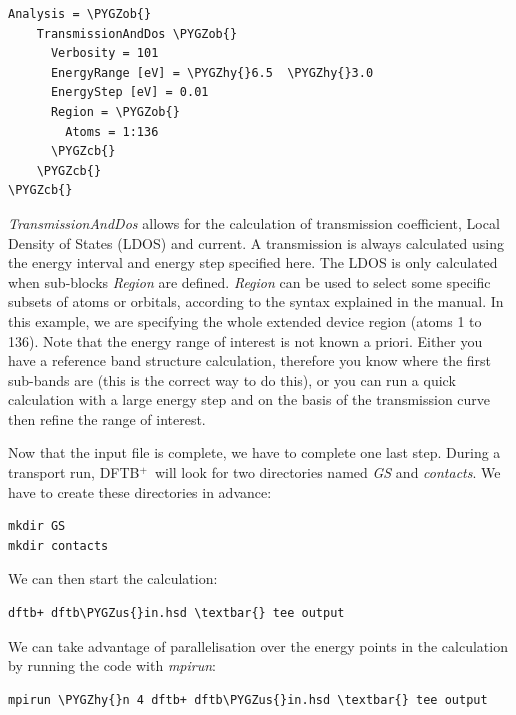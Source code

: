 \documentclass[a4paper,11pt,english]{sphinxmanual}
\newcommand{\dftbp}{\textsf{DFTB$^{\text{+}}$\ }} %
\def\PYGZus{\char`\_}
\def\PYGZob{\char`\{}
\def\PYGZcb{\char`\}}
\def\PYGZhy{\char`\-}
\begin{document}
{{\begin{Verbatim}[commandchars=\\\{\}]
Analysis = \PYGZob{}
    TransmissionAndDos \PYGZob{}
      Verbosity = 101
      EnergyRange [eV] = \PYGZhy{}6.5  \PYGZhy{}3.0
      EnergyStep [eV] = 0.01
      Region = \PYGZob{}
        Atoms = 1:136
      \PYGZcb{}
    \PYGZcb{}
\PYGZcb{}
\end{Verbatim}

\emph{TransmissionAndDos} allows for the calculation of transmission
coefficient, Local Density of States (LDOS) and current. A
transmission is always calculated using the energy interval and energy
step specified here. The LDOS is only calculated when sub-blocks
\emph{Region} are defined. \emph{Region} can be used to select some specific
subsets of atoms or orbitals, according to the syntax explained in the
manual. In this example, we are specifying the whole extended device
region (atoms 1 to 136). Note that the energy range of interest is not
known a priori. Either you have a reference band structure
calculation, therefore you know where the first sub-bands are (this is
the correct way to do this), or you can run a quick calculation with a
large energy step and on the basis of the transmission curve then
refine the range of interest.

Now that the input file is complete, we have to complete one last
step. During a transport run, \dftbp will look for two directories
named \emph{GS} and \emph{contacts}. We have to create these directories in
advance:

\begin{Verbatim}[commandchars=\\\{\}]
mkdir GS
mkdir contacts
\end{Verbatim}

We can then start the calculation:

\begin{Verbatim}[commandchars=\\\{\}]
dftb+ dftb\PYGZus{}in.hsd \textbar{} tee output
\end{Verbatim}

We can take advantage of parallelisation over the energy points in the
calculation by running the code with \emph{mpirun}:

\begin{Verbatim}[commandchars=\\\{\}]
mpirun \PYGZhy{}n 4 dftb+ dftb\PYGZus{}in.hsd \textbar{} tee output
\end{Verbatim}

}}
\end{document}
